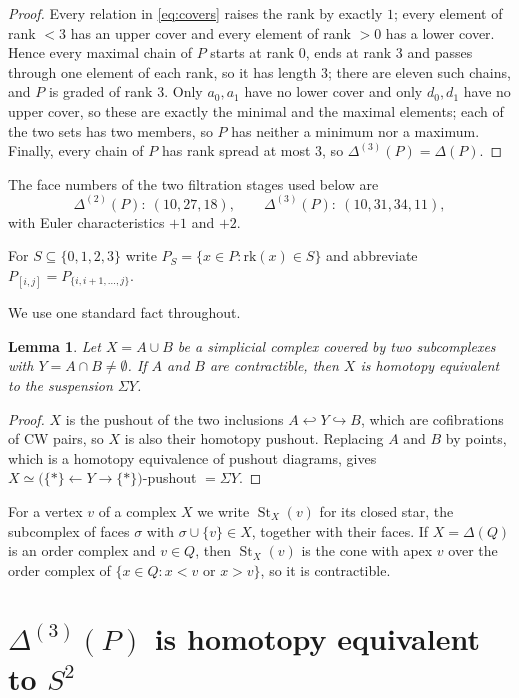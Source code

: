 \documentclass[11pt]{amsart}
\newtheorem{lemma}[theorem]{Lemma}
\DeclareMathOperator{\St}{St}
\newcommand{\rk}{\mathrm{rk}}
\newcommand{\Dl}{\Delta}
\newcommand{\Susp}{\Sigma}
\begin{document}
\begin{proof}
Every relation in \eqref{eq:covers} raises the rank by exactly $1$; every
element of rank $<3$ has an upper cover and every element of rank $>0$ has a
lower cover. Hence every maximal chain of $P$ starts at rank $0$, ends at
rank $3$ and passes through one element of each rank, so it has length $3$;
there are eleven such chains, and $P$ is graded of rank $3$. Only $a_0,a_1$
have no lower cover and only $d_0,d_1$ have no upper cover, so these are
exactly the minimal and the maximal elements; each of the two sets has two
members, so $P$ has neither a minimum nor a maximum. Finally, every chain of
$P$ has rank spread at most $3$, so $\Dl^{(3)}(P)=\Dl(P)$.
\end{proof}

The face numbers of the two filtration stages used below are
\begin{equation}\label{eq:fvec}
  \Dl^{(2)}(P)\colon\ (10,27,18),\qquad
  \Dl^{(3)}(P)\colon\ (10,31,34,11),
\end{equation}
with Euler characteristics $+1$ and $+2$.

For $S\subseteq\{0,1,2,3\}$ write $P_S=\{x\in P:\rk(x)\in S\}$ and abbreviate
$P_{[i,j]}=P_{\{i,i+1,\ldots,j\}}$.

We use one standard fact throughout.

\begin{lemma}\label{lem:susp}
Let $X=A\cup B$ be a simplicial complex covered by two subcomplexes with
$Y=A\cap B\ne\emptyset$. If $A$ and $B$ are contractible, then $X$ is homotopy
equivalent to the suspension $\Susp Y$.
\end{lemma}

\begin{proof}
$X$ is the pushout of the two inclusions $A\hookleftarrow Y\hookrightarrow B$,
which are cofibrations of CW pairs, so $X$ is also their homotopy pushout.
Replacing $A$ and $B$ by points, which is a homotopy equivalence of pushout
diagrams, gives $X\simeq\bigl(\{*\}\leftarrow Y\rightarrow\{*\}\bigr)$-pushout
$=\Susp Y$.
\end{proof}

For a vertex $v$ of a complex $X$ we write $\St_X(v)$ for its closed star, the
subcomplex of faces $\sigma$ with $\sigma\cup\{v\}\in X$, together with their
faces. If $X=\Dl(Q)$ is an order complex and $v\in Q$, then $\St_X(v)$ is the
cone with apex $v$ over the order complex of $\{x\in Q:x<v\text{ or }x>v\}$,
so it is contractible.

\section{$\Dl^{(3)}(P)$ is homotopy equivalent to $S^2$}\label{sec:top}
\end{document}
